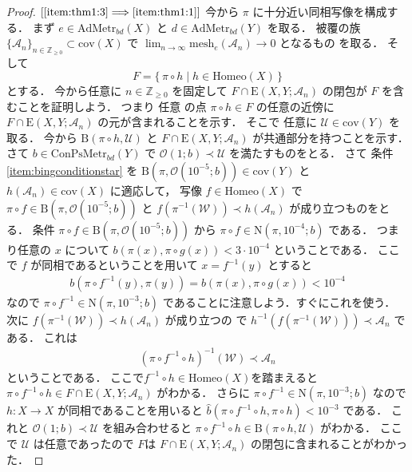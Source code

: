 \documentclass[leqno, a4paper, 12pt]{jsarticle}
\numberwithin{equation}{section}
\newcommand{\To}{\Longrightarrow}
\newcommand{\zz}{\mathbb{Z}}
\newcommand{\yocov}[1]{\mathrm{cov}(#1)}
\newcommand{\yocovfont}[1]{\mathscr{#1}}
\newcommand{\yofine}{\prec}
\newcommand{\yonbset}[2]{\mathrm{B}(#1, #2)}
\newcommand{\yonbsetq}[3]{\mathrm{N}(#1, #2; #3)}
\newcommand{\yosupmet}[1]{\hat{#1}}
\newcommand{\yocbmet}[1]{\mathrm{ConPsMetr}_{bd}(#1)}
\newcommand{\yocbamet}[1]{\mathrm{AdMetr}_{bd}(#1)}
\newcommand{\yoballfam}[2]{\yocovfont{O}(#1; #2)}
\newcommand{\yocmaps}[3]{\mathrm{E}(#1, #2; #3)}
\newcommand{\yomaphset}[1]{\mathrm{Homeo}(#1)}
\newcommand{\yomesh}{\mathrm{mesh}}
\begin{document}
\begin{proof}
$[\ref{item:thm1:3}\To \ref{item:thm1:1}]$
今から
$\pi$
に十分近い同相写像を構成する．
まず
$e\in \yocbamet{X}$
と
$d\in \yocbamet{Y}$
を取る．
被覆の族
$\{\yocovfont{A}_{n}\}_{n\in \zz_{\ge 0}}\subset \yocov{X}$
で
$\lim_{n\to \infty}\yomesh_{e}(\yocovfont{A}_{n})\to 0$
となるもの
を取る．
そして
\[
F=\{\, \pi\circ h\mid h\in \yomaphset{X}\, \}
\]
とする．
今から任意に
$n\in \zz_{\ge 0}$
を固定して
$F\cap \yocmaps{X}{Y}{\yocovfont{A}_{n}}$
の閉包が
$F$
を含むことを証明しよう．
つまり
任意
の点
$\pi\circ h\in F$
の任意の近傍に
$F\cap \yocmaps{X}{Y}{\yocovfont{A}_{n}}$
の元が含まれることを示す．
そこで
任意に
$\yocovfont{U}\in \yocov{Y}$
を取る．
今から
$\yonbset{\pi\circ h}{\yocovfont{U}}$
と
$F\cap \yocmaps{X}{Y}{\yocovfont{A}_{n}}$
が共通部分を持つことを示す．
さて
$b\in \yocbmet{Y}$
で
$\yoballfam{1}{b}\yofine \yocovfont{U}$
を満たすものをとる．
さて
条件
\ref{item:bingconditionstar}
を
$\yonbset{\pi}{\yoballfam{10^{-5}}{b}}\in \yocov{Y}$
と
$h(\yocovfont{A}_{n})\in \yocov{X}$
に適応して，
写像
$f\in \yomaphset{X}$
で
$\pi\circ f\in \yonbset{\pi}{\yoballfam{10^{-5}}{b}}$
と
$f(\pi^{-1}(\yocovfont{W}))\yofine h(\yocovfont{A}_{n})$
が成り立つものをとる．
条件
$\pi\circ f\in \yonbset{\pi}{\yoballfam{10^{-5}}{b}}$
から
$\pi \circ f\in \yonbsetq{\pi}{10^{-4}}{b}$
である．
つまり任意の
$x$
について
$b(\pi(x), \pi\circ g(x))<3\cdot 10^{-4}$
ということである．
ここで
$f$
が同相であるということを用いて
$x=f^{-1}(y)$
とすると
\begin{align}
b(\pi\circ f^{-1}(y), \pi(y))=b(\pi(x), \pi\circ g(x))<10^{-4}
\end{align}
なので
$\pi\circ f^{-1}\in \yonbsetq{\pi}{10^{-3}}{b}$
であることに注意しよう．すぐにこれを使う．
次に
$f(\pi^{-1}(\yocovfont{W}))\yofine h(\yocovfont{A}_{n})$
が成り立つの
で
$h^{-1}(f(\pi^{-1}(\yocovfont{W})))\yofine \yocovfont{A}_{n}$
である．
これは
\begin{align}
(\pi\circ f^{-1}\circ h)^{-1}(\yocovfont{W})\yofine 
\yocovfont{A}_{n}
\end{align}
ということである．
ここで$f^{-1}\circ h\in \yomaphset{X}$を踏まえると
$\pi\circ f^{-1}\circ h\in F\cap \yocmaps{X}{Y}{\yocovfont{A}_{n}}$
がわかる．
さらに
$\pi\circ f^{-1}\in \yonbsetq{\pi}{10^{-3}}{b}$
なので
$h\colon X\to X$
が同相であることを用いると
$\yosupmet{b}(\pi\circ f^{-1}\circ h, \pi\circ h)<10^{-3}$
である．
これと
$\yoballfam{1}{b}\yofine \yocovfont{U}$
を組み合わせると
$\pi\circ f^{-1}\circ h\in \yonbset{\pi\circ h}{\yocovfont{U}}$
がわかる．
ここで
$\yocovfont{U}$
は任意であったので
$F$は
$F\cap \yocmaps{X}{Y}{\yocovfont{A}_{n}}$
の閉包に含まれることがわかった．

\end{proof}
\end{document}
